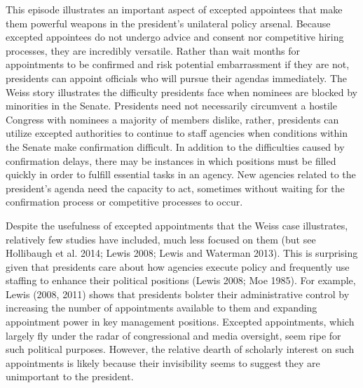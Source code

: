 \documentclass[12pt]{article}
\begin{document}
	This episode illustrates an important aspect of excepted appointees that make them powerful weapons in the president's unilateral policy arsenal. Because excepted appointees do not undergo advice and consent nor competitive hiring processes, they are incredibly versatile. Rather than wait months for appointments to be confirmed and risk potential embarrassment if they are not, presidents can appoint officials who will pursue their agendas immediately. The Weiss story illustrates the difficulty presidents face when nominees are blocked by minorities in the Senate. Presidents need not necessarily circumvent a hostile Congress with nominees a majority of members dislike, rather, presidents can utilize excepted authorities to continue to staff agencies when conditions within the Senate make confirmation difficult. In addition to the difficulties caused by confirmation delays, there may be instances in which positions must be filled quickly in order to fulfill essential tasks in an agency. New agencies related to the president's agenda need the capacity to act, sometimes without waiting for the confirmation process or competitive processes to occur. 

	Despite the usefulness of excepted appointments that the Weiss case illustrates, relatively few studies have included, much less focused on them (but see Hollibaugh et al. 2014; Lewis 2008; Lewis and Waterman 2013). This is surprising given that presidents care about how agencies execute policy and frequently use staffing to enhance their political positions (Lewis 2008; Moe 1985). For example, Lewis (2008, 2011) shows that presidents bolster their administrative control by increasing the number of appointments available to them and expanding appointment power in key management positions. Excepted appointments, which largely fly under the radar of congressional and media oversight, seem ripe for such political purposes. However, the relative dearth of scholarly interest on such appointments is likely because their invisibility seems to suggest they are unimportant to the president.
	
\end{document}
